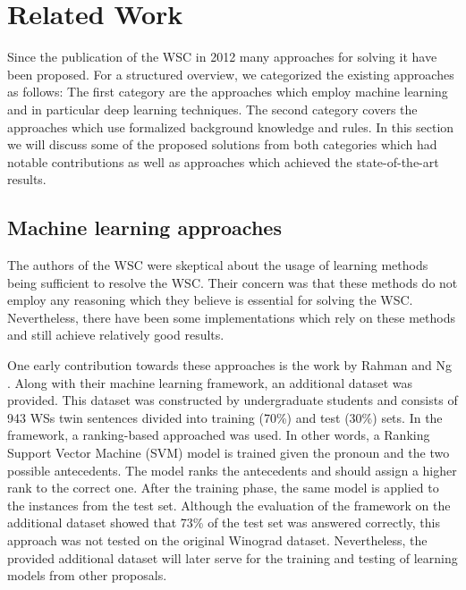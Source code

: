 \section{Related Work}
\label{section:TheDifferentApproaches}

Since the publication of the WSC in 2012 many approaches for solving it have been proposed. For a structured overview, we categorized the existing approaches as follows: The first category are the approaches which employ machine learning and in particular deep learning techniques. 
The second category covers the approaches which use formalized background knowledge and rules. 
In this section we will discuss some of the proposed solutions from both categories which had notable contributions as well as approaches which achieved the state-of-the-art results.

\begin{comment}
Main challenge for rule base systems: how to obtain non-domain specific knowledge base; how to reason on top of that; if predefined as Peter's too constraint

Main challenge for ML approaches: not enough reasoning, it's learning statistic, with small changes would fail
Good approach: knowledge hunting frameworks; maybe recognizing different subsets of sentences
\end{comment}

\subsection{Machine learning approaches}

The authors of the WSC were skeptical about the usage of learning methods being sufficient to resolve the WSC. Their concern was that these methods do not employ any reasoning which they believe is essential for solving the WSC. 
Nevertheless, there have been some implementations which rely on these methods and still achieve relatively good results. 

One early contribution towards these approaches is the work by Rahman and Ng \cite{DBLP:conf/emnlp/RahmanN12}. Along with their machine learning framework, an additional dataset was provided. This dataset was constructed by undergraduate students and consists of 943 WSs twin sentences divided into training (70\%) and test (30\%) sets. In the framework, a ranking-based approached was used. In other words, a Ranking Support Vector Machine (SVM) model \cite{DBLP:conf/kdd/Joachims02} is trained given the pronoun and the two possible antecedents. The model ranks the antecedents and should assign a higher rank to the correct one. After the training phase, the same model is applied to the instances from the test set. Although the evaluation of the framework on the additional dataset showed that 73\% of the test set was answered correctly, this approach was not tested on the original Winograd dataset.  Nevertheless, the provided additional dataset will later serve for the training and testing of learning models from other proposals. 

